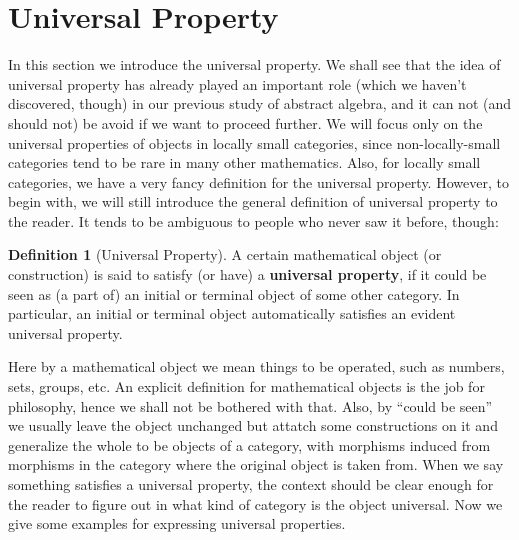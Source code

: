 \documentclass{article}
\theoremstyle{definition}
\newtheorem{definition}{Definition}[section]
\theoremstyle{definition}
\theoremstyle{remark}
\begin{document}
\section{Universal Property}
In this section we introduce the universal property. We shall see that the idea of universal property has already played an important role (which we haven't discovered, though) in our previous study of abstract algebra, and it can not (and should not) be avoid if we want to proceed further. We will focus only on the universal properties of objects in locally small categories, since non-locally-small categories tend to be rare in many other mathematics. Also, for locally small categories, we have a very fancy definition for the universal property. However, to begin with, we will still introduce the general definition of universal property to the reader. It tends to be ambiguous to people who never saw it before, though:
\begin{definition}[Universal Property]
A certain mathematical object (or construction) is said to satisfy (or have) a \textbf{universal property}, if it could be seen as (a part of) an initial or terminal object of some other category. In particular, an initial or terminal object automatically satisfies an evident universal property. 
\end{definition}
Here by a mathematical object we mean things to be operated, such as numbers, sets, groups, etc. An explicit definition for mathematical objects is the job for philosophy, hence we shall not be bothered with that. Also, by ``could be seen'' we usually leave the object unchanged but attatch some constructions on it and generalize the whole to be objects of a category, with morphisms induced from morphisms in the category where the original object is taken from. When we say something satisfies a universal property, the context should be clear enough for the reader to figure out in what kind of category is the object universal. Now we give some examples for expressing universal properties. 
\end{document}
